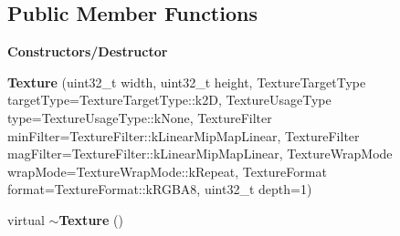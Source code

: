 \subsection*{Public Member Functions}
\begin{Indent}\textbf{ Constructors/\+Destructor}\par
\begin{DoxyCompactItemize}
\item 
\mbox{\label{classrev_1_1_texture_a89d334db38d5630ea2873c6dea9d3b9c}} 
{\bfseries Texture} (uint32\+\_\+t width, uint32\+\_\+t height, Texture\+Target\+Type target\+Type=Texture\+Target\+Type\+::k2D, Texture\+Usage\+Type type=Texture\+Usage\+Type\+::k\+None, Texture\+Filter min\+Filter=Texture\+Filter\+::k\+Linear\+Mip\+Map\+Linear, Texture\+Filter mag\+Filter=Texture\+Filter\+::k\+Linear\+Mip\+Map\+Linear, Texture\+Wrap\+Mode wrap\+Mode=Texture\+Wrap\+Mode\+::k\+Repeat, Texture\+Format format=Texture\+Format\+::k\+R\+G\+B\+A8, uint32\+\_\+t depth=1)
\item 
\mbox{\label{classrev_1_1_texture_a4963fa672a5452a0840bea76df8635ee}} 
virtual {\bfseries $\sim$\+Texture} ()
\end{DoxyCompactItemize}
\end{Indent}
